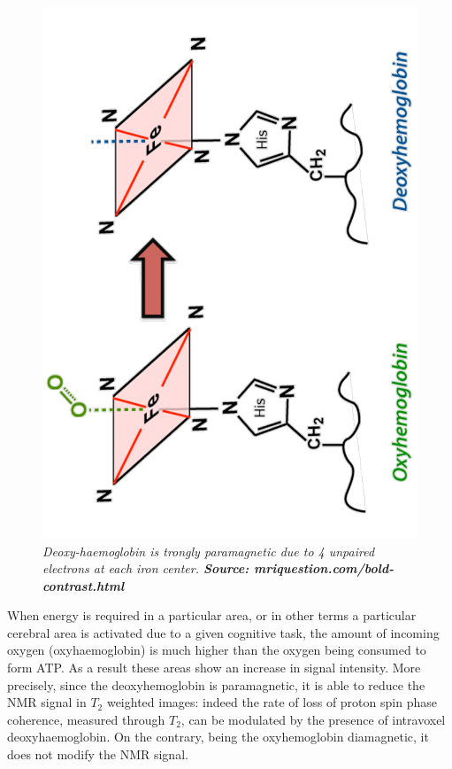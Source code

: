 \documentclass[12pt,openright,twoside,a4paper]{book}
\begin{document}
\begin{figure}[!h]
\centering
\includegraphics[scale=0.3, angle=270]{haemo}
\caption{\textit{ Deoxy-haemoglobin is trongly paramagnetic due to 4 unpaired electrons at each iron center. \textbf{Source: mriquestion.com/bold-contrast.html}}}
\label{haemo}
\end{figure}

When energy is required in a particular area, or in other terms a particular cerebral area is activated due to a given cognitive task, the amount of incoming oxygen (oxyhaemoglobin) is much higher than the oxygen being consumed to form ATP. 
As a result these areas show an increase in signal intensity.
More precisely, since the deoxyhemoglobin is paramagnetic, it is able to reduce the NMR signal in $T_2$ weighted images: indeed the rate of loss of proton spin phase coherence, measured through $T_2$, can be modulated by the presence of intravoxel deoxyhaemoglobin. On the contrary, being the oxyhemoglobin diamagnetic, it does not modify the NMR signal.
\end{document}
